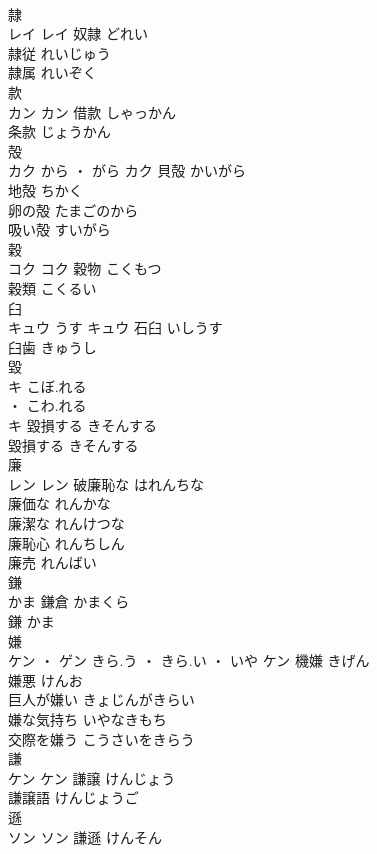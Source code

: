 \documentclass[8pt]{extreport}
\begin{document}
\begin{CJK}{UTF8}{min}
\\	隷	
\\	レイ		レイ	奴隷	どれい	
\\	隷従	れいじゅう	
\\	隷属	れいぞく	
\\	款	
\\	カン		カン	借款	しゃっかん	
\\	条款	じょうかん	
\\	殻	
\\	カク	から ・ がら	カク	貝殻	かいがら	
\\	地殻	ちかく	
\\	卵の殻	たまごのから	
\\	吸い殻	すいがら	
\\	穀	
\\	コク		コク	穀物	こくもつ	
\\	穀類	こくるい	
\\	臼	
\\	キュウ	うす	キュウ	石臼	いしうす	
\\	臼歯	きゅうし	
\\	毀	
\\	キ	こぼ.れる
\\	・ こわ.れる
\\	キ	毀損する	きそんする	
\\	毀損する	きそんする	
\\	廉	
\\	レン		レン	破廉恥な	はれんちな	
\\	廉価な	れんかな	
\\	廉潔な	れんけつな	
\\	廉恥心	れんちしん	
\\	廉売	れんばい	
\\	鎌	
\\	かま														鎌倉	かまくら	
\\	鎌	かま	
\\	嫌	
\\	ケン ・ ゲン	きら.う ・ きら.い ・ いや	ケン	機嫌	きげん	
\\	嫌悪	けんお	
\\	巨人が嫌い	きょじんがきらい	
\\	嫌な気持ち	いやなきもち	
\\	交際を嫌う	こうさいをきらう	
\\	謙	
\\	ケン		ケン	謙譲	けんじょう	
\\	謙譲語	けんじょうご	
\\	遜	
\\	ソン		ソン	謙遜	けんそん	

\end{CJK}
\end{document}
